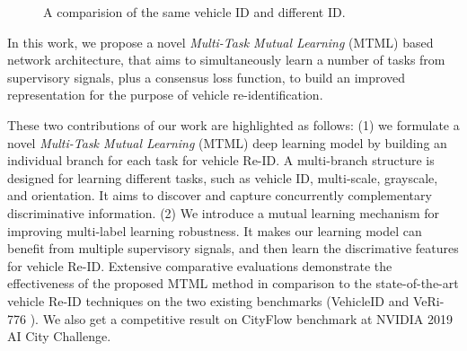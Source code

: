 \documentclass[10pt,twocolumn,letterpaper]{article}
\begin{document}
\begin{figure}
  \caption{A comparision of the same vehicle ID and different ID.}
	\label{F:veh_comparison}
\end{figure}

In this work, we propose a novel {\em Multi-Task Mutual Learning}
(MTML) based network architecture,
that aims to simultaneously learn a number of tasks from supervisory signals, plus a consensus loss function, to build an improved representation for the purpose of vehicle re-identification.

These two contributions of our work are highlighted as follows:
(1) we formulate a novel {\em Multi-Task Mutual Learning} (MTML) deep learning model by building an individual branch for each task for vehicle Re-ID.
A multi-branch structure is designed for learning different tasks, such as vehicle ID, multi-scale, grayscale, and orientation.
It aims to discover and capture concurrently complementary discriminative information.
(2) We introduce a mutual learning mechanism for improving multi-label learning robustness.
It makes our learning model can benefit from multiple supervisory signals, and then learn the discrimative features for vehicle Re-ID.
Extensive comparative evaluations demonstrate the effectiveness of the
proposed MTML method in comparison to the state-of-the-art vehicle Re-ID techniques on the two existing benchmarks
(VehicleID \cite{liu2016vehicleid} and VeRi-776 \cite{liu2016veri}).
We also get a competitive result on CityFlow \cite{tang2019cityflow} benchmark at NVIDIA 2019 AI City Challenge.
\end{document}
